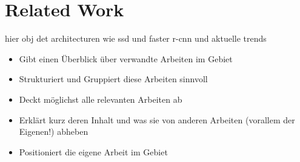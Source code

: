 \section{Related Work}\label{sec:related_work}

hier obj det architecturen wie ssd und faster r-cnn und aktuelle trends

\begin{itemize}
    \item Gibt einen Überblick über verwandte Arbeiten im Gebiet
    \item Strukturiert und Gruppiert diese Arbeiten sinnvoll
    \item Deckt möglichst alle relevanten Arbeiten ab
    \item Erklärt kurz deren Inhalt und was sie von anderen Arbeiten (vorallem der Eigenen!) abheben
    \item Positioniert die eigene Arbeit im Gebiet
\end{itemize}
